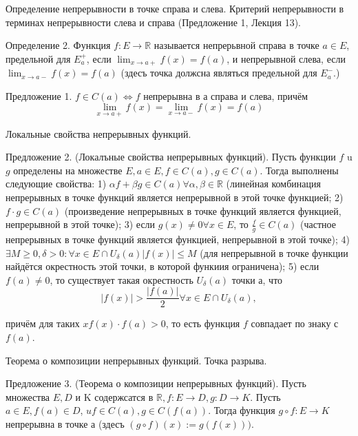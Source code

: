\newpage
\begin{problem}
Определение непрерывности в точке справа и слева. Критерий непрерывности в терминах непрерывности слева и справа (Предложение 1, Лекция 13).
\end{problem}
Определение 2. Функция $f: E \rightarrow \mathbb{R}$ называется непрерьвной справа в точке $a \in E$, предельной для $E_a^{+}$, если $\lim _{x \rightarrow a+} f(x)=f(a)$, и непрерывной слева, если $\lim _{x \rightarrow a-} f(x)=f(a)$ (здесъ точка должсна являться предельной для $E_a^{-}$.)

Предложение 1. $f \in C(a) \Leftrightarrow f$ непрерывна в а справа и слева, причём
$$
\lim _{x \rightarrow a+} f(x)=\lim _{x \rightarrow a-} f(x)=f(a)
$$

\newpage
\begin{problem}
Локальные свойства непрерывных функций.
\end{problem}

Предложение 2. (Локалъные свойства непрерывных функций). Пусть функции $f$ u $g$ определены на множестве $E, a \in E, f \in C(a), g \in C(a)$. Тогда выполнены следующие свойства:
1) $\alpha f+\beta g \in C(a) \forall \alpha, \beta \in \mathbb{R}$ (линейная комбинация непрерывных в точке функций является непрерывной в этой точке функцией;
2) $f \cdot g \in C(a)$ (произведение непрерывных в точке функций является функцией, непрерывной в этой точке);
3) если $g(x) \neq 0 \forall x \in E$, то $\frac{f}{g} \in C(a)$ (частное непрерывных в точке функций является функцией, непрерывной в этой точке);
4) $\exists M \geq 0, \delta>0: \forall x \in E \cap U_\delta(a)|f(x)| \leq M$ (для непрерывной в точке функции найдётся окрестность этой точки, в которой функиия ограничена);
5) если $f(a) \neq 0$, то существует такая окрестность $U_\delta(a)$ точки а, что
$$
|f(x)|>\frac{|f(a)|}{2} \forall x \in E \cap U_\delta(a),
$$

причём для таких $x f(x) \cdot f(a)>0$, то есть функция $f$ совпадает по знаку с $f(a)$.

\newpage
\begin{problem}
Теорема о композиции непрерывных функций. Точка разрыва.
\end{problem}
Предложение 3. (Теорема о композиции непрерывных функций). Пусть множества $E, D$ и K содержсатся в $\mathbb{R}, f: E \rightarrow D, g: D \rightarrow K$. Пусть $a \in E, f(a) \in D$, $u f \in C(a), g \in C(f(a))$. Тогда функция $g \circ f: E \rightarrow K$ непрерывна в точке а (здесъ $(g \circ f)(x):=g(f(x)))$.

